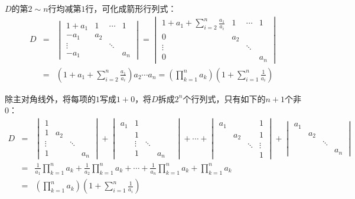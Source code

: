 \begin{solution}[解法一]
$D$的第$2\sim n$行均减第$1$行，可化成箭形行列式：
\begin{eqnarray*}
D & = & \begin{vmatrix} 1+a_1 & 1 & \cdots & 1 \\ -a_1 & a_2 & & \\ \vdots & & \ddots & \\ -a_1 & & & a_n \end{vmatrix} = \begin{vmatrix} 1+a_1+\sum\limits_{i=2}^n\frac{a_1}{a_i} & 1 & \cdots & 1 \\ 0 & a_2 & & \\ \vdots & & \ddots & \\ 0 & & & a_n \end{vmatrix} \\
& = & (1+a_1+\sum\limits_{i=2}^n\frac{a_1}{a_i})a_2\cdots a_n = (\prod\limits_{k=1}^n a_k)(1+\sum\limits_{i=1}^n\frac{1}{a_i})
\end{eqnarray*}
\end{solution}

\begin{solution}[解法二]
除主对角线外，将每项的$1$写成$1+0$，将$D$拆成$2^n$个行列式，只有如下的$n+1$个非$0$：
\begin{eqnarray*}
D & = & \begin{vmatrix} 1 & & & \\ 1 & a_2 & & \\ \vdots & & \ddots & \\ 1 & & & a_n \end{vmatrix} + \begin{vmatrix} a_1 & 1 & & \\ & 1 & & & \\ & \vdots & \ddots & \\ & 1 & & a_n \end{vmatrix} + \cdots + \begin{vmatrix} a_1 & & & 1 \\ & a_2 & & 1 \\ & & \ddots & \vdots \\  & & & 1 \end{vmatrix} + \begin{vmatrix} a_1 & & & \\ & a_2 & & \\ & & \ddots & \\ & & & a_n \end{vmatrix} \\
& = & \frac{1}{a_1}\prod\limits_{k=1}^n a_k + \frac{1}{a_2}\prod\limits_{k=1}^n a_k + \cdots + \frac{1}{a_n}\prod\limits_{k=1}^n a_k + \prod\limits_{k=1}^n a_k \\
& = & (\prod\limits_{k=1}^n a_k)(1+\sum\limits_{i=1}^n\frac{1}{a_i})
\end{eqnarray*}
\end{solution}

